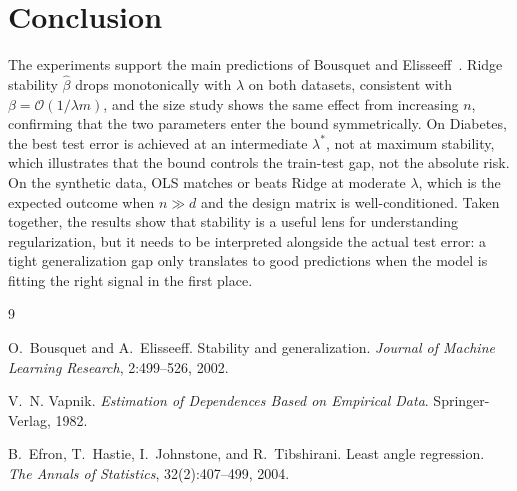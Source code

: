 \documentclass[11pt, a4paper, twoside]{article}
\newcommand{\betahat}{\hat{\beta}}
\begin{document}
\section{Conclusion}

The experiments support the main predictions of Bousquet and
Elisseeff~\cite{bousquet2002}.
Ridge stability $\betahat$ drops monotonically with $\lambda$ on both datasets,
consistent with $\beta = \mathcal{O}(1/\lambda m)$, and the size study shows the
same effect from increasing $n$, confirming that the two parameters enter the bound
symmetrically.
On Diabetes, the best test error is achieved at an intermediate $\lambda^*$, not at
maximum stability, which illustrates that the bound controls the
train-test gap, not the absolute risk.
On the synthetic data, OLS matches or beats Ridge at moderate $\lambda$, which is
the expected outcome when $n \gg d$ and the design matrix is well-conditioned.
Taken together, the results show that stability is a useful lens for understanding
regularization, but it needs to be interpreted alongside the actual test error:
a tight generalization gap only translates to good predictions when the model is
fitting the right signal in the first place.


\begin{thebibliography}{9}

O.~Bousquet and A.~Elisseeff.
\newblock Stability and generalization.
\newblock \emph{Journal of Machine Learning Research}, 2:499--526, 2002.

V.~N. Vapnik.
\newblock \emph{Estimation of Dependences Based on Empirical Data}.
\newblock Springer-Verlag, 1982.

B.~Efron, T.~Hastie, I.~Johnstone, and R.~Tibshirani.
\newblock Least angle regression.
\newblock \emph{The Annals of Statistics}, 32(2):407--499, 2004.

\end{thebibliography}
\end{document}
